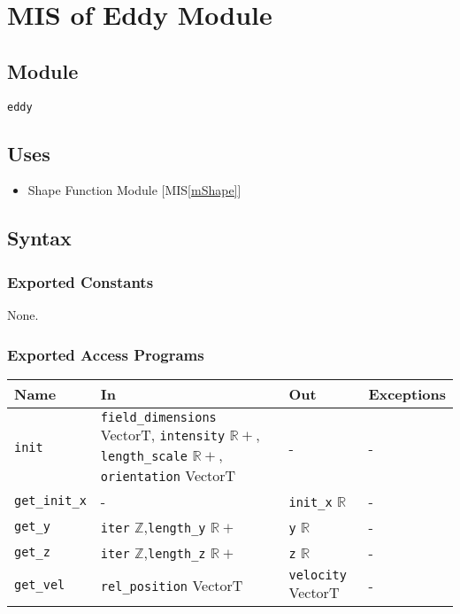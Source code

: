 \documentclass[12pt, titlepage]{article}
\begin{document}
\newpage
\section{MIS of Eddy Module} \label{mEddy} 

\subsection{Module}
\texttt{eddy}

\subsection{Uses}
\begin{itemize}
\item Shape Function Module [MIS\ref{mShape}]
\end{itemize}

\subsection{Syntax}

\subsubsection{Exported Constants}
None.

\subsubsection{Exported Access Programs}

\begin{center}
\begin{tabular}{p{2cm} p{5.6cm} p{3cm} p{3cm}}
\hline
\textbf{Name} & \textbf{In} & \textbf{Out} & \textbf{Exceptions} \\
\hline
\texttt{init} & \texttt{field\_dimensions} VectorT, \newline\texttt{intensity} $\mathbb{R+}$, \newline\texttt{length\_scale} $\mathbb{R+}$, \newline\texttt{orientation} VectorT & - & - \\
\texttt{get\_init\_x}& - & \texttt{init\_x} $\mathbb{R}$ & - \\
\texttt{get\_y}& \texttt{iter} $\mathbb{Z}$,\newline\texttt{length\_y} $\mathbb{R+}$ & \texttt{y} $\mathbb{R}$ & - \\
\texttt{get\_z}& \texttt{iter} $\mathbb{Z}$,\newline\texttt{length\_z} $\mathbb{R+}$ & \texttt{z} $\mathbb{R}$ & - \\
\texttt{get\_vel}& \texttt{rel\_position} VectorT & \texttt{velocity} VectorT & - \\
\hline
\end{tabular}
\end{center}
\end{document}
